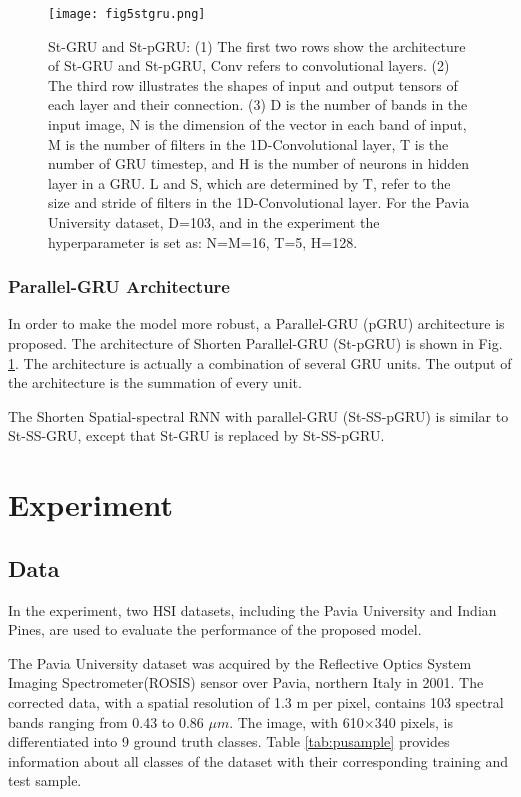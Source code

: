 \documentclass[conference]{IEEEtran}
\begin{document}
\begin{figure}[htbp]
    \centerline{\texttt{[image: fig5stgru.png]}}
    \caption{St-GRU and St-pGRU: (1) The first two rows show the architecture of St-GRU
    and St-pGRU, Conv refers to convolutional layers. (2) The third row illustrates the
    shapes of input and output tensors of each layer and their connection. (3) D is the
    number of bands in the input image, N is the dimension of the vector in each band
    of input, M is the number of filters in the 1D-Convolutional layer, T is the number
    of GRU timestep, and H is the number of neurons in hidden layer in a GRU. L and S,
    which are determined by T, refer to the size and stride of filters in the
    1D-Convolutional layer. For the Pavia University dataset, D=103, and in the
    experiment the hyperparameter is set as: N=M=16, T=5, H=128.}
    \label{fig:stgru}
\end{figure}

\subsubsection{Parallel-GRU Architecture}

In order to make the model more robust, a Parallel-GRU (pGRU) architecture is proposed.
The architecture of Shorten Parallel-GRU (St-pGRU) is shown in Fig. \ref{fig:stgru}.
The architecture is actually a combination of several GRU units. The output of the
architecture is the summation of every unit.

The Shorten Spatial-spectral RNN with parallel-GRU (St-SS-pGRU) is similar to St-SS-GRU,
except that St-GRU is replaced by St-SS-pGRU.

\section{Experiment}

\subsection{Data}

In the experiment, two HSI datasets, including the Pavia University and Indian Pines,
are used to evaluate the performance of the proposed model.

The Pavia University dataset was acquired by the Reflective Optics System Imaging
Spectrometer(ROSIS) sensor over Pavia, northern Italy in 2001. The corrected data,
with a spatial resolution of 1.3 m per pixel, contains 103 spectral bands ranging
from 0.43 to 0.86 $\mu m$. The image, with 610$\times$340 pixels, is differentiated into
9 ground truth classes. Table \ref{tab:pusample} provides information about all
classes of the dataset with their corresponding training and test sample.
\end{document}
